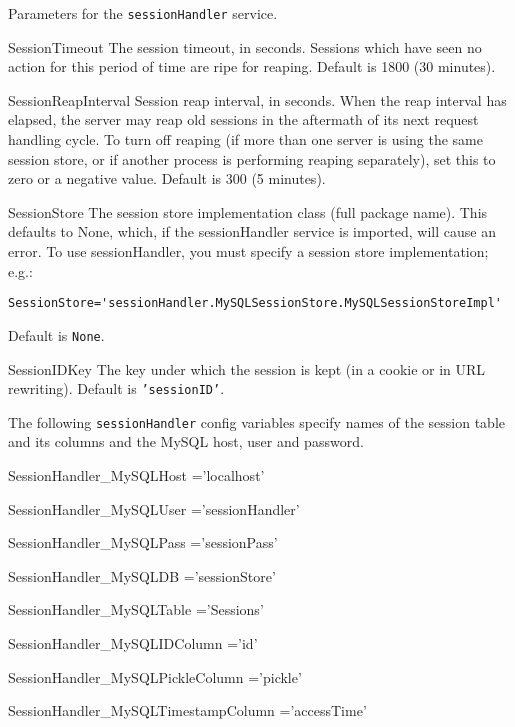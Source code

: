 \documentclass[titlepage]{manual}
\begin{document}
Parameters for the \texttt{sessionHandler} service.
\begin{argdesc}
\item[SessionTimeout] 
The session timeout, in seconds.  Sessions which have seen no action
for this period of time are ripe for reaping.
Default is 1800 (30 minutes).
\item[SessionReapInterval]
Session reap interval, in seconds.  When the reap interval has elapsed,
the server may reap old sessions in the aftermath of its next
request handling cycle.  To turn off reaping (if more than one
server is using the same session store, or if another process
is performing reaping separately), set this to zero or a negative
value.
Default is 300 (5 minutes).
\item[SessionStore]
The session store implementation class (full package name). This
defaults to None, which, if the sessionHandler service is imported,
will cause an error.  To use sessionHandler, you must specify a session
store implementation; e.g.:
\begin{verbatim}
SessionStore='sessionHandler.MySQLSessionStore.MySQLSessionStoreImpl'
\end{verbatim}
Default is \texttt{None}.
\item[SessionIDKey]
The key under which the session is kept (in a cookie or in URL rewriting).
Default is \texttt{'sessionID'}.
\end{argdesc}
The following \texttt{sessionHandler} config variables specify names
of the session table and its columns and the MySQL host, user and password.
\begin{argdesc}
\item[SessionHandler_MySQLHost]='localhost'
\item[SessionHandler_MySQLUser]='sessionHandler'
\item[SessionHandler_MySQLPass]='sessionPass'
\item[SessionHandler_MySQLDB]='sessionStore'
\item[SessionHandler_MySQLTable]='Sessions'
\item[SessionHandler_MySQLIDColumn]='id'
\item[SessionHandler_MySQLPickleColumn]='pickle'
\item[SessionHandler_MySQLTimestampColumn]='accessTime'
\end{argdesc}
\end{document}
